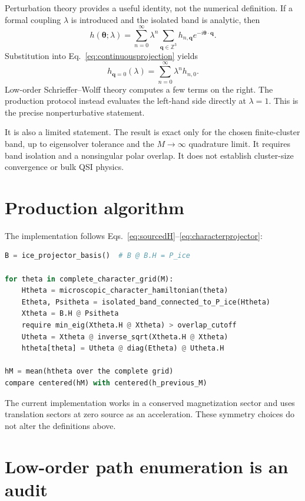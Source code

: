 \documentclass[11pt]{article}
\newcommand{\bq}{\bm q}
\newcommand{\btheta}{\bm\theta}
\begin{document}
Perturbation theory provides a useful identity, not the numerical definition.
If a formal coupling $\lambda$ is introduced and the isolated band is
analytic, then
\begin{equation}
 h(\btheta;\lambda)=
 \sum_{n=0}^{\infty}\lambda^n
 \sum_{\bq\in\mathbb Z^3}h_{n,\bq}e^{-i\btheta\cdot\bq}.
 \label{eq:formalseries}
\end{equation}
Substitution into Eq.~\eqref{eq:continuousprojection} yields
\begin{equation}
 h_{\bq=0}(\lambda)=\sum_{n=0}^{\infty}\lambda^n h_{n,0}.
\end{equation}
Low-order Schrieffer--Wolff theory computes a few terms on the right.  The
production protocol instead evaluates the left-hand side directly at
$\lambda=1$.  This is the precise nonperturbative statement.

It is also a limited statement.  The result is exact only for the chosen
finite-cluster band, up to eigensolver tolerance and the $M\to\infty$
quadrature limit.  It requires band isolation and a nonsingular polar overlap.
It does not establish cluster-size convergence or bulk QSI physics.

\section{Production algorithm}

The implementation follows Eqs.~\eqref{eq:sourcedH}--\eqref{eq:characterprojector}:
\begin{lstlisting}[language=Python]
B = ice_projector_basis()  # B @ B.H = P_ice

for theta in complete_character_grid(M):
    Htheta = microscopic_character_hamiltonian(theta)
    Etheta, Psitheta = isolated_band_connected_to_P_ice(Htheta)
    Xtheta = B.H @ Psitheta
    require min_eig(Xtheta.H @ Xtheta) > overlap_cutoff
    Utheta = Xtheta @ inverse_sqrt(Xtheta.H @ Xtheta)
    htheta[theta] = Utheta @ diag(Etheta) @ Utheta.H

hM = mean(htheta over the complete grid)
compare centered(hM) with centered(h_previous_M)
\end{lstlisting}
The current implementation works in a conserved magnetization sector and
uses translation sectors at zero source as an acceleration.  These symmetry
choices do not alter the definitions above.

\section{Low-order path enumeration is an audit}
\end{document}
